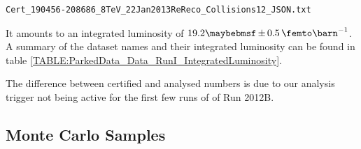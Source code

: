 \begin{verbatim}
Cert_190456-208686_8TeV_22Jan2013ReReco_Collisions12_JSON.txt
\end{verbatim}

It amounts to an integrated luminosity of $19.2 \pm 0.5 \,\femto\barn^{-1}$. A summary of the dataset names and their integrated luminosity can be found in table \ref{TABLE:ParkedData_Data_RunI_IntegratedLuminosity}.



The difference between certified and analysed numbers is due to our analysis trigger not being active for the first few runs of of Run 2012B.

\subsection{Monte Carlo Samples}

